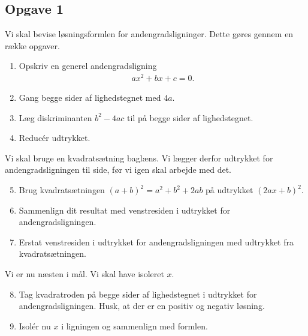 \newpage

\subsection*{Opgave 1}
Vi skal bevise løsningsformlen for andengradsligninger. Dette gøres gennem en række opgaver.
\begin{enumerate}[label=\roman*)]
	\item Opskriv en generel andengradsligning
	\begin{align*}
		ax^2 + bx + c = 0.
	\end{align*}
	\item Gang begge sider af lighedstegnet med $4a$.
	\item Læg diskriminanten $b^2 - 4ac$ til på begge sider af lighedstegnet.
	\item Reducér udtrykket.
\end{enumerate}
Vi skal bruge en kvadratsætning baglæns. Vi lægger derfor udtrykket for andengradsligningen til side, før vi igen skal arbejde med det.
\begin{enumerate}[label=\roman*)]
	\setcounter{enumi}{4}
	\item Brug kvadratsætningen $(a+b)^2 = a^2 + b^2 + 2ab$ på udtrykket $(2ax + b)^2$.
	\item Sammenlign dit resultat med venstresiden i udtrykket for andengradsligningen. 
	\item Erstat venstresiden i udtrykket for andengradsligningen med udtrykket fra kvadratsætningen. 
\end{enumerate}
Vi er nu næsten i mål. Vi skal have isoleret $x$. 
\begin{enumerate}[label=\roman*)]
	\setcounter{enumi}{7}
	\item Tag kvadratroden på begge sider af lighedstegnet i udtrykket for andengradsligningen. Husk, at der 
	er en positiv og negativ løsning.
	\item Isolér nu $x$ i ligningen og sammenlign med formlen.
\end{enumerate}
